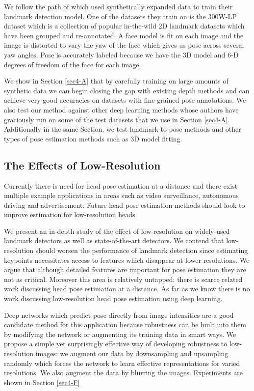 \documentclass[10pt,twocolumn,letterpaper]{article}
\begin{document}
We follow the path of \cite{bulat2017far} which used synthetically expanded data to train their landmark detection model. One of the datasets they train on is the 300W-LP dataset which is a collection of popular in-the-wild 2D landmark datasets which have been grouped and re-annotated. A face model is fit on each image and the image is distorted to vary the yaw of the face which gives us pose across several yaw angles. Pose is accurately labeled because we have the 3D model and 6-D degrees of freedom of the face for each image. 

We show in Section \ref{sec4-A} that by carefully training on large amounts of synthetic data we can begin closing the gap with existing depth methods and can achieve very good accuracies on datasets with fine-grained pose annotations. We also test our method against other deep learning methods whose authors have graciously run on some of the test datasets that we use in Section \ref{sec4-A}. Additionally in the same Section, we test landmark-to-pose methods and other types of pose estimation methods such as 3D model fitting.

\subsection{The Effects of Low-Resolution}\label{sec3-E}
Currently there is need for head pose estimation at a distance and there exist multiple example applications in areas such as video surveillance, autonomous driving and advertisement. Future head pose estimation methods should look to improve estimation for low-resolution heads.

We present an in-depth study of the effect of low-resolution on widely-used landmark detectors as well as state-of-the-art detectors. We contend that low-resolution should worsen the performance of landmark detection since estimating keypoints necessitates access to features which disappear at lower resolutions. We argue that although detailed features are important for pose estimation they are not as critical. Moreover this area is relatively untapped: there is scarce related work discussing head pose estimation at a distance. As far as we know there is no work discussing low-resolution head pose estimation using deep learning.

Deep networks which predict pose directly from image intensities are a good candidate method for this application because robustness can be built into them by modifying the network or augmenting its training data in smart ways. We propose a simple yet surprisingly effective way of developing robustness to low-resolution images: we augment our data by downsampling and upsampling randomly which forces the network to learn effective representations for varied resolutions. We also augment the data by blurring the images. Experiments are shown in Section \ref{sec4-F}
\end{document}
